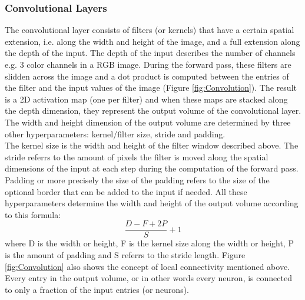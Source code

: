 \documentclass{article}
\begin{document}
\subsubsection{Convolutional Layers}
The convolutional layer consists of filters (or kernels) that have a certain spatial extension, i.e. along the width and height of the image, and a full extension along the depth of the input. The depth of the input describes the number of channels e.g. 3 color channels in a RGB image. During the forward pass, these filters are slidden across the image and a dot product is computed between the entries of the filter and the input values of the image (Figure \ref{fig:Convolution}). The result is a 2D activation map (one per filter) and when these maps are stacked along the depth dimension, they represent the output volume of the convolutional layer.
The width and height dimension of the output volume are determined by three other hyperparameters: kernel/filter size, stride and padding.\\
The kernel size is the width and height of the filter window described above. The stride referrs to the amount of pixels the filter is moved along the spatial dimensions of the input at each step during the computation of the forward pass. Padding or more precisely the size of the padding refers to the size of the optional border that can be added to the input if needed. All these hyperparameters determine the width and height of the output volume according to this formula:
\[
\frac{D-F+2P}{S}+1
\]
where D is the width or height, F is the kernel size along the width or height, P is the amount of padding and S referrs to the stride length. Figure \ref{fig:Convolution} also shows the concept of local connectivity mentioned above. Every entry in the output volume, or in other words every neuron, is connected to only a fraction of the input entries (or neurons).\\\\
\end{document}
